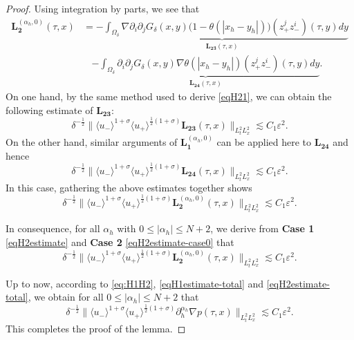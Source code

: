 \documentclass[10pt,reqno]{amsart}
\numberwithin{equation}{section}
\begin{document}
\begin{proof}
	Using integration by parts, we see that
	\begin{align*}
		\mathbf{L}_{\mathbf{2}}^{(\alpha_h,0)}(\tau,x)
		&=
		\underbrace{-\int_{\Omega_\delta}\nabla\partial_i\partial_j G_\delta(x,y)\big(1-\theta(|x_h-y_h|)\big)(z_+^jz_-^i)(\tau,y)dy}_{\displaystyle \mathbf{L}_{\mathbf{23}}(\tau,x)}\\
		&\ \ \ \ \underbrace{-\int_{\Omega_\delta}\!\!\partial_i\partial_j G_\delta(x,y)\nabla\theta(|x_h-y_h|)(z_+^jz_-^i)(\tau,y)dy}_{\displaystyle \mathbf{L}_{\mathbf{24}}(\tau,x)}.
	\end{align*}
	On one hand, 	by the same method used to derive 
	\eqref{eqH21}, we can obtain the following estimate of $\mathbf{L}_{\mathbf{23}}$:
	\begin{equation*}
		\delta^{-\frac{1}{2}}\big\|\langle u_-\rangle^{1+\sigma}\langle u_+\rangle^{\frac{1}{2}(1+\sigma)}\mathbf{L}_{\mathbf{23}}(\tau,x)\big\|_{L^2_tL^2_x}\lesssim C_1\varepsilon^2.
	\end{equation*}
	On the other hand, similar arguments of $\mathbf{L}_{\mathbf{1}}^{(\alpha_h,0)}$ can be applied here to $\mathbf{L}_{\mathbf{24}}$ and hence 
	\begin{equation*} 
		\delta^{-\frac{1}{2}}\big\|\langle u_-\rangle^{1+\sigma}\langle u_+\rangle^{\frac{1}{2}(1+\sigma)}\mathbf{L}_{\mathbf{24}}(\tau,x)\big\|_{L^2_tL^2_x}\lesssim C_1\varepsilon^2.
	\end{equation*}
	In this case, gathering 
	the above estimates together shows
	\begin{equation}\label{eqH2estimate-case0} 
		\delta^{-\frac{1}{2}}\big\|\langle u_-\rangle^{1+\sigma}\langle u_+\rangle^{\frac{1}{2}(1+\sigma)}\mathbf{L}_{\mathbf{2}}^{(\alpha_h,0)}(\tau,x)\big\|_{L^2_tL^2_x}\lesssim C_1\varepsilon^2.
	\end{equation}
	
	In consequence, for all $\alpha_h$ with $0\leqslant|\alpha_h|\leqslant N+2$, we derive from \textbf{Case 1} \eqref{eqH2estimate} and \textbf{Case 2} \eqref{eqH2estimate-case0} that 
	\begin{equation}\label{eqH2estimate-total} 
		\delta^{-\frac{1}{2}}\big\|\langle u_-\rangle^{1+\sigma}\langle u_+\rangle^{\frac{1}{2}(1+\sigma)}\mathbf{L}_{\mathbf{2}}^{(\alpha_h,0)}(\tau,x)\big\|_{L^2_tL^2_x}\lesssim C_1\varepsilon^2.
	\end{equation}
	
	
	Up to now, according to \eqref{eq:H1H2}, \eqref{eqH1estimate-total} and \eqref{eqH2estimate-total}, we obtain for all $0\leqslant|\alpha_h|\leqslant N+2$ that 
	\begin{equation*}
		\delta^{-\frac{1}{2}}\big\|\langle u_-\rangle^{1+\sigma}\langle u_+\rangle^{\frac{1}{2}(1+\sigma)}\partial_{h}^{\alpha_h} \nabla p(\tau,x)\big\|_{L^2_tL^2_x}
		\lesssim C_1\varepsilon^2.
	\end{equation*}
	This completes the proof of the lemma. 
\end{proof}
\end{document}
